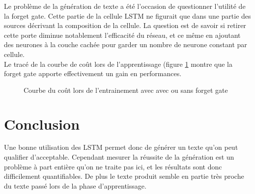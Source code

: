 Le problème de la génération de texte a été l'occasion de questionner l'utilité de la forget gate. Cette partie de la cellule LSTM ne figurait que dans une partie des sources décrivant la composition de la cellule.
La question est de savoir si retirer cette porte diminue notablement l'efficacité du réseau, et ce même en ajoutant des neurones à la couche cachée pour garder un nombre de neurone constant par cellule.
\\ Le tracé de la courbe de coût lors de l'apprentissage (figure \ref{forget_gate} montre que la forget gate apporte effectivement un gain en performances.

\begin{figure}[H]
\centering
{}
\caption{Courbe du coût lors de l'entrainement avec avec ou sans forget gate}
\label{forget_gate}
\end{figure}


\section{Conclusion}
Une bonne utilisation des LSTM permet donc de générer un texte qu'on peut qualifier d'acceptable. Cependant mesurer la réussite de la génération est un problème à part entière qu'on ne traite pas ici, et les résultats sont donc difficilement quantifiables. De plus le texte produit semble en partie très proche du texte passé lors de la phase d'apprentissage.


